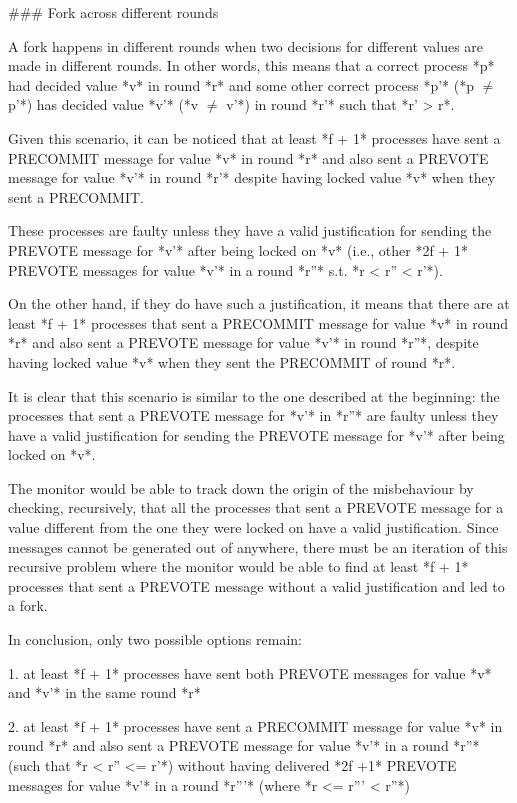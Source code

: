 \documentclass[a4paper,11pt,oneside]{report}
\begin{document}
\begin{markdown}
### Fork across different rounds

A fork happens in different rounds when two decisions for different values are made in different rounds. 
In other words, this means that a correct process *p* had decided value *v* in round *r* and some other correct process *p'* (*p $\neq$ p'*) has decided value *v'* (*v $\neq$ v'*) in round *r'* such that *r' > r*. 

Given this scenario, it can be noticed that at least *f + 1* processes have sent a PRECOMMIT message for value *v* in round *r* and also sent a PREVOTE message for value *v'* in round *r'* despite having locked value *v* when they sent a PRECOMMIT.

These processes are faulty unless they have a valid justification for sending the PREVOTE message for *v'* after being locked on *v* (i.e., other *2f + 1* PREVOTE messages for value *v'* in a round *r''* s.t. *r < r'' < r'*).
 
On the other hand, if they do have such a justification, it means that there are at least *f + 1* processes that sent a PRECOMMIT message for value *v* in round *r* and also sent a PREVOTE message for value *v'* in round *r''*, despite having locked value *v* when they sent the PRECOMMIT of round *r*.

It is clear that this scenario is similar to the one described at the beginning: the processes that sent a PREVOTE message for *v'* in *r''* are faulty unless they have a valid justification for sending the PREVOTE message for *v'* after being locked on *v*.

The monitor would be able to track down the origin of the misbehaviour by checking, recursively, that all the processes that sent a PREVOTE message for a value different from the one they were locked on have a valid justification.
Since messages cannot be generated out of anywhere, there must be an iteration of this recursive problem where the monitor would be able to find at least *f + 1* processes that sent a PREVOTE message without a valid justification and led to a fork.

In conclusion, only two possible options remain:

1. at least *f + 1* processes have sent both PREVOTE messages for value *v* and *v'* in the same round *r*

2. at least *f + 1* processes have sent a PRECOMMIT message for value *v* in round *r* and also sent a PREVOTE message for value *v'* in a round *r''* (such that *r < r'' <= r'*) without having delivered *2f +1* PREVOTE messages for value *v'* in a round *r'''* (where *r <= r''' < r''*)


\end{markdown}
\end{document}
